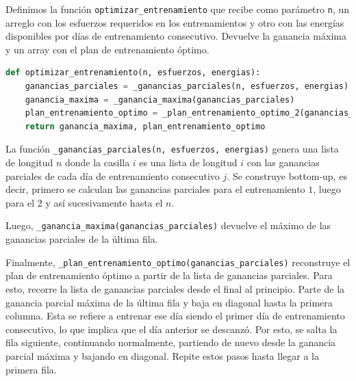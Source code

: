 Definimos la función \texttt{optimizar\_entrenamiento} que recibe como parámetro \texttt{n}, un arreglo con los esfuerzos requeridos
en los entrenamientos y otro con las energías disponibles por días de entrenamiento consecutivo. Devuelve la ganancia máxima y un array
con el plan de entrenamiento óptimo.

\begin{lstlisting}[language=Python]
def optimizar_entrenamiento(n, esfuerzos, energias):
    ganancias_parciales = _ganancias_parciales(n, esfuerzos, energias)
    ganancia_maxima = _ganancia_maxima(ganancias_parciales)
    plan_entrenamiento_optimo = _plan_entrenamiento_optimo_2(ganancias_parciales)
    return ganancia_maxima, plan_entrenamiento_optimo
\end{lstlisting}

La función \texttt{\_ganancias\_parciales(n, esfuerzos, energias)} genera una lista de longitud $n$ donde
la casilla $i$ es una lista de longitud $i$ con las ganancias parciales de cada día de entrenamiento
consecutivo $j$. Se construye bottom-up, es decir, primero se calculan las ganancias
parciales para el entrenamiento $1$, luego para el $2$ y así sucesivamente hasta el $n$.

Luego, \texttt{\_ganancia\_maxima(ganancias\_parciales)} devuelve el máximo de las ganancias parciales de la
última fila.

Finalmente, \texttt{\_plan\_entrenamiento\_optimo(ganancias\_parciales)} reconstruye el plan de entrenamiento
óptimo a partir de la lista de ganancias parciales. Para esto, recorre la lista de ganancias parciales desde
el final al principio. Parte de la ganancia parcial máxima de la última fila y baja en diagonal hasta la
primera columna. Esta se refiere a entrenar ese día siendo el primer día de entrenamiento consecutivo, lo que
implica que el día anterior se descanzó. Por esto, se salta la fila siguiente, continuando normalmente, 
partiendo de nuevo desde la ganancia parcial máxima y bajando en diagonal. Repite estos pasos hasta
llegar a la primera fila.
